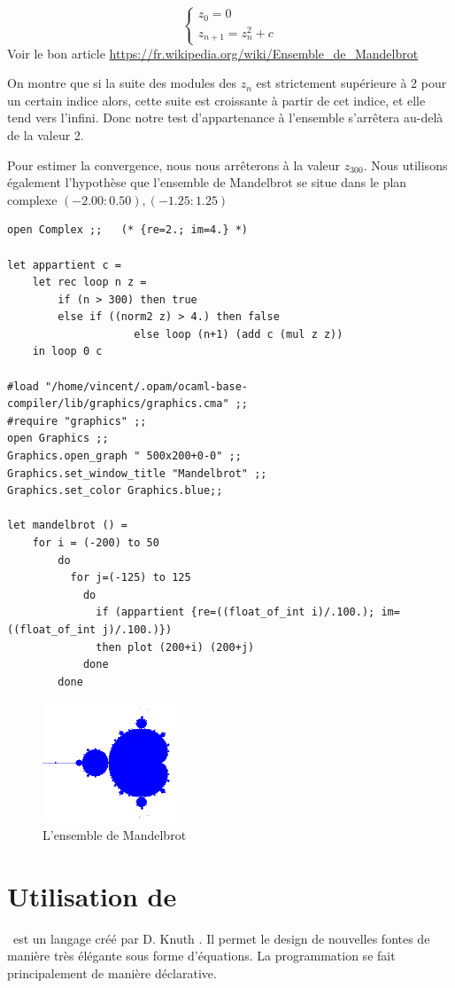\documentclass[11pt]{book}
\begin{document}
$$
\begin{cases}
	z_0=0\\
	z_{n+1}=z_n^2+c
\end{cases}
$$
Voir le bon article \url{https://fr.wikipedia.org/wiki/Ensemble_de_Mandelbrot}

On montre que si la suite des modules des $z_n$ est strictement supérieure à 2 pour un certain indice alors,
cette suite est croissante à partir de cet indice, et elle tend vers l'infini.
Donc notre test d'appartenance à l'ensemble s'arrêtera au-delà de la valeur 2.

Pour estimer la convergence, nous nous arrêterons à la valeur $z_{300}$.
Nous utilisons également l'hypothèse que l'ensemble de Mandelbrot se situe dans le plan complexe
$(-2.00:0.50), (-1.25:1.25)$
\begin{Verbatim}
open Complex ;;   (* {re=2.; im=4.} *)

let appartient c =
	let rec loop n z =
		if (n > 300) then true
		else if ((norm2 z) > 4.) then false
					else loop (n+1) (add c (mul z z)) 
	in loop 0 c  

#load "/home/vincent/.opam/ocaml-base-compiler/lib/graphics/graphics.cma" ;;
#require "graphics" ;; 
open Graphics ;;
Graphics.open_graph " 500x200+0-0" ;;
Graphics.set_window_title "Mandelbrot" ;;
Graphics.set_color Graphics.blue;;

let mandelbrot () =
	for i = (-200) to 50
		do
		  for j=(-125) to 125
			do
			  if (appartient {re=((float_of_int i)/.100.); im=((float_of_int j)/.100.)}) 
			  then plot (200+i) (200+j) 
			done
		done 
\end{Verbatim}

\begin{figure}[H]
	\centering
	\caption{L'ensemble de Mandelbrot}
	\includegraphics[width=4.0cm]{mandelbrot.png}
\end{figure}

\section{Utilisation de \MF}
\MF\ est un langage créé par D. Knuth \cite{mf}. Il permet le
design de nouvelles fontes de manière très élégante sous forme d'équations.
La programmation se fait principalement de manière déclarative.
\end{document}
